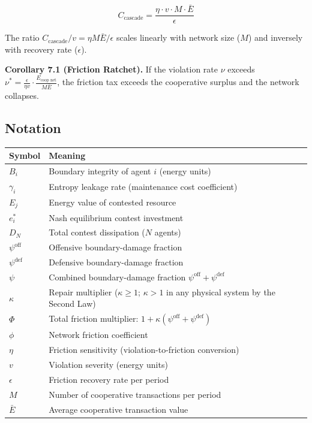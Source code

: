 \documentclass[11pt]{article}
\newcounter{none}
\begin{document}
\[C_{\text{cascade}} = \frac{\eta \cdot v \cdot M \cdot \bar{E}}{\epsilon}\]

The ratio \(C_{\text{cascade}}/v = \eta M \bar{E} / \epsilon\) scales
linearly with network size (\(M\)) and inversely with recovery rate
(\(\epsilon\)).

\textbf{Corollary 7.1 (Friction Ratchet).} If the violation rate \(\nu\)
exceeds
\(\nu^* = \frac{\epsilon}{\eta v} \cdot \frac{E_{\text{coop net}}}{M \bar{E}}\),
the friction tax exceeds the cooperative surplus and the network
collapses.

\subsection{Notation}\label{notation}

{\def\LTcaptype{none} %
\begin{longtable}[]{@{}
  >{\raggedright\arraybackslash}p{}
  >{\raggedright\arraybackslash}p{}@{}}
\toprule\noalign{}
\begin{minipage}[b]{\linewidth}\raggedright
Symbol
\end{minipage} & \begin{minipage}[b]{\linewidth}\raggedright
Meaning
\end{minipage} \\
\midrule\noalign{}
\endhead
\bottomrule\noalign{}
\endlastfoot
\(B_i\) & Boundary integrity of agent \(i\) (energy units) \\
\(\gamma_i\) & Entropy leakage rate (maintenance cost coefficient) \\
\(E_j\) & Energy value of contested resource \\
\(e_i^*\) & Nash equilibrium contest investment \\
\(D_N\) & Total contest dissipation (\(N\) agents) \\
\(\psi^{\text{off}}\) & Offensive boundary-damage fraction \\
\(\psi^{\text{def}}\) & Defensive boundary-damage fraction \\
\(\psi\) & Combined boundary-damage fraction
\(\psi^{\text{off}} + \psi^{\text{def}}\) \\
\(\kappa\) & Repair multiplier (\(\kappa \geq 1\); \(\kappa > 1\) in any
physical system by the Second Law) \\
\(\Phi\) & Total friction multiplier:
\(1 + \kappa(\psi^{\text{off}} + \psi^{\text{def}})\) \\
\(\phi\) & Network friction coefficient \\
\(\eta\) & Friction sensitivity (violation-to-friction conversion) \\
\(v\) & Violation severity (energy units) \\
\(\epsilon\) & Friction recovery rate per period \\
\(M\) & Number of cooperative transactions per period \\
\(\bar{E}\) & Average cooperative transaction value \\
\end{longtable}
}
\end{document}
